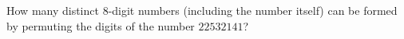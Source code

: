 How many distinct $8$-digit numbers (including the number itself) can be formed by permuting the digits of the number $22532141$?
